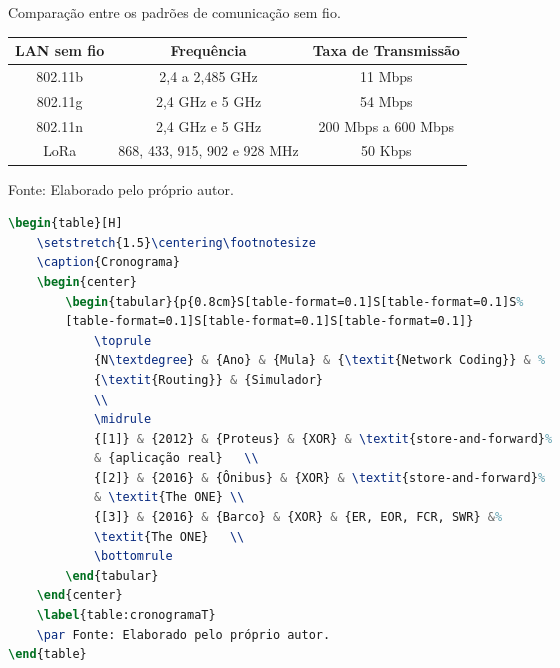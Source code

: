 \begin{Quadro}[H]
    \centering\footnotesize
    \caption{Comparação entre os padrões de comunicação sem fio.}
    \begin{center}
        \begin{tabular}{|c|c|c|}
            \hline
            \textbf{LAN sem fio} & \textbf{Frequência} & \textbf{Taxa de Transmissão}  \\ \hline
            {802.11b} & 2,4 a 2,485 GHz& 11 Mbps\\ \hline
            {802.11g} & 2,4 GHz e 5 GHz& 54 Mbps \\ \hline
            {802.11n} & 2,4 GHz e 5 GHz & 200 Mbps a 600 Mbps \\ \hline
            {LoRa} & 868, 433, 915, 902 e 928 MHz & 50 Kbps \\ \hline
        \end{tabular}
    \end{center}
    \label{qua:transmissaoSemFio}
    \par Fonte: Elaborado pelo próprio autor.
\end{Quadro}

\begin{lstlisting}[language=TeX, caption={Cronograma Code}]
\begin{table}[H]
    \setstretch{1.5}\centering\footnotesize
    \caption{Cronograma}
    \begin{center}
        \begin{tabular}{p{0.8cm}S[table-format=0.1]S[table-format=0.1]S%
        [table-format=0.1]S[table-format=0.1]S[table-format=0.1]}
            \toprule
            {N\textdegree} & {Ano} & {Mula} & {\textit{Network Coding}} & %
            {\textit{Routing}} & {Simulador}
            \\
            \midrule
            {[1]} & {2012} & {Proteus} & {XOR} & \textit{store-and-forward}%
            & {aplicação real}   \\
            {[2]} & {2016} & {Ônibus} & {XOR} & \textit{store-and-forward}%
            & \textit{The ONE} \\ 
            {[3]} & {2016} & {Barco} & {XOR} & {ER, EOR, FCR, SWR} &%
            \textit{The ONE}   \\
            \bottomrule
        \end{tabular}
    \end{center}
    \label{table:cronogramaT}
    \par Fonte: Elaborado pelo próprio autor.
\end{table}
\end{lstlisting}



